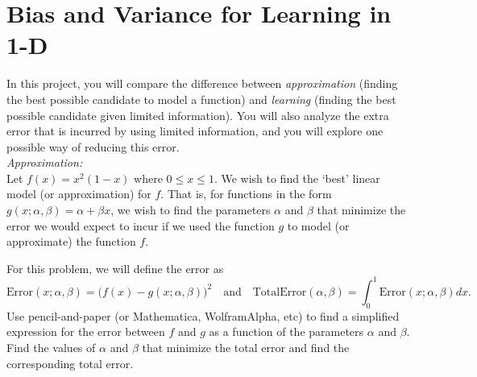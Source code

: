 \section{Bias and Variance for Learning in 1-D}
In this project, you will compare the difference between \textit{approximation} (finding the best possible candidate to model a function) and \textit{learning} (finding the best possible candidate given limited information). 
You will also analyze the extra error that is incurred by using limited information, and you will explore one possible way of reducing this error.\\

\noindent\textit{Approximation:}\\
Let $f(x) = x^2(1-x)$ where $0 \leq x \leq 1$. We wish to find the `best' linear model (or approximation) for $f$. That is, for functions in the form $g(x; \alpha, \beta) =  \alpha +  \beta x$,  we wish to find the parameters $ \alpha$ and $ \beta$ that minimize the error we would expect to incur if we used the function $g$ to model (or approximate) the function $f$. 
\begin{center}
\end{center}
For this problem, we will define the error as
\begin{equation*}
\text{Error}(x;\alpha,\beta) = \Big(f(x) - g(x; \alpha, \beta)\Big)^2 
\quad \text{and} \quad
\text{TotalError}(\alpha,\beta) = \int_0^1 \text{Error}(x; \alpha,\beta) dx.
\end{equation*} 
Use pencil-and-paper (or Mathematica, WolframAlpha, etc) to find a simplified expression for the error between $f$ and $g$ as a function of the parameters $ \alpha$ and $ \beta$. Find the values of $ \alpha$ and $ \beta$ that minimize the total error and find the corresponding total error.\\

